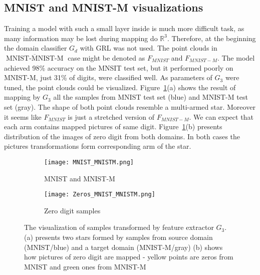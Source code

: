 \documentclass[shortabstract, inz, english]{iithesis}
\DeclareMathOperator{\mnistM}{MNIST-MNIST-M}
\newcommand{\mnist}{$\overline{\mnistM}$ }
\begin{document}
\subsection{MNIST and MNIST-M visualizations}
Training a model with such a small layer inside is much more difficult task, as many information may be lost during mapping do $\mathbb{R}^{3}$. Therefore, at the beginning the domain classifier $G_{d}$ with GRL was not used. The point clouds in \mnist case might be denoted as $F_{MNIST}$ and $F_{MNIST-M}$. The model achieved 98\% accuracy on the MNSIT test set, but it performed poorly on MNIST-M, just 31\% of digits, were classified well. As parameters of $G_{3}$ were tuned, the point clouds could be visualized. Figure~\ref{fig:MNIST_3D}(a) shows the result of mapping by $G_{3}$ all the samples from MNIST test set (blue) and MNIST-M test set (gray). The shape of both point clouds resemble a multi-armed star. Moreover it seems like $F_{MNIST}$ is just a stretched version of $F_{MNIST-M}$. We can expect that each arm contains mapped pictures of same digit. Figure~\ref{fig:MNIST_3D}(b) presents distribution of the images of zero digit from both domains. In both cases the pictures transformations form corresponding arm of the star.
\par
\begin{figure}[htb]%
    \centering
    \begin{subfigure}[b]{0.48\textwidth}
        \texttt{[image: MNIST\_MNISTM.png]}
        \caption{MNIST and MNIST-M}
    \end{subfigure}%
    \begin{subfigure}[b]{0.48\textwidth}
        \texttt{[image: Zeros\_MNIST\_MNISTM.png]}
        \caption{Zero digit samples}
    \end{subfigure}%
    \caption{The visualization of samples transformed by feature extractor $G_{3}$. (a) presents two stars formed by samples from source domain (MNIST/blue) and a target domain (MNIST-M/gray) (b) shows how pictures of zero digit are mapped - yellow points are zeros from MNIST and green ones from MNIST-M}%
    \label{fig:MNIST_3D}%
\end{figure}
\end{document}
